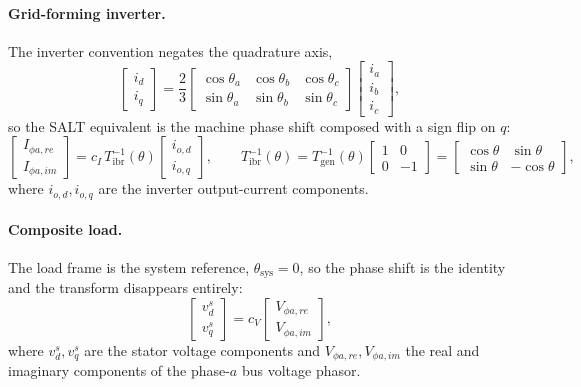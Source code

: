 \documentclass[11pt]{article}
\begin{document}
\paragraph{Grid-forming inverter.}
The inverter convention negates the quadrature axis,
\begin{equation}
  \begin{bmatrix}i_d\\ i_q\end{bmatrix}
  = \frac{2}{3}
  \begin{bmatrix}
    \cos\theta_a & \cos\theta_b & \cos\theta_c\\
    \sin\theta_a & \sin\theta_b & \sin\theta_c
  \end{bmatrix}
  \begin{bmatrix}i_a\\ i_b\\ i_c\end{bmatrix},
\end{equation}
so the SALT equivalent is the machine phase shift composed with a sign flip
on $q$:
\begin{equation}
  \begin{bmatrix}I_{\phi a,re}\\ I_{\phi a,im}\end{bmatrix}
  = c_I\,T_{\text{ibr}}^{-1}(\theta)\begin{bmatrix}i_{o,d}\\ i_{o,q}\end{bmatrix},
  \qquad
  T_{\text{ibr}}^{-1}(\theta)
  = T_{\text{gen}}^{-1}(\theta)\begin{bmatrix}1&0\\0&-1\end{bmatrix}
  = \begin{bmatrix}\cos\theta & \sin\theta\\ \sin\theta & -\cos\theta\end{bmatrix},
  \label{eq:Tibr}
\end{equation}
where $i_{o,d},i_{o,q}$ are the inverter output-current components.

\paragraph{Composite load.}
The load frame is the system reference, $\theta_{\text{sys}}=0$, so the
phase shift is the identity and the transform disappears entirely:
\begin{equation}
  \begin{bmatrix}v_d^s\\ v_q^s\end{bmatrix}
  = c_V \begin{bmatrix}V_{\phi a,re}\\ V_{\phi a,im}\end{bmatrix},
\end{equation}
where $v_d^s,v_q^s$ are the stator voltage components and
$V_{\phi a,re},V_{\phi a,im}$ the real and imaginary components of the
phase-$a$ bus voltage phasor.
\end{document}
